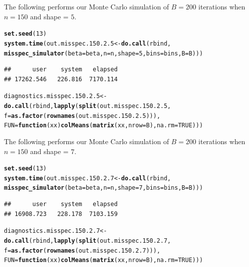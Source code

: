 \documentclass[11pt]{article}\usepackage[]{graphicx}\usepackage[]{color}
\makeatletter
\newcommand{\hlnum}[1]{\textcolor[rgb]{0.686,0.059,0.569}{#1}}%
\newcommand{\hlstd}[1]{\textcolor[rgb]{0.345,0.345,0.345}{#1}}%
\newcommand{\hlkwa}[1]{\textcolor[rgb]{0.161,0.373,0.58}{\textbf{#1}}}%
\newcommand{\hlkwb}[1]{\textcolor[rgb]{0.69,0.353,0.396}{#1}}%
\newcommand{\hlkwc}[1]{\textcolor[rgb]{0.333,0.667,0.333}{#1}}%
\newcommand{\hlkwd}[1]{\textcolor[rgb]{0.737,0.353,0.396}{\textbf{#1}}}%
\newenvironment{kframe}{%
 \def\at@end@of@kframe{}%
 \ifinner\ifhmode%
  \def\at@end@of@kframe{\end{minipage}}%
  \begin{minipage}{\columnwidth}%
 \fi\fi%
 \def\FrameCommand##1{\hskip\@totalleftmargin \hskip-\fboxsep
 \colorbox{shadecolor}{##1}\hskip-\fboxsep
     \hskip-\linewidth \hskip-\@totalleftmargin \hskip\columnwidth}%
 \MakeFramed {\advance\hsize-\width
   \@totalleftmargin\z@ \linewidth\hsize
   \@setminipage}}%
 {\par\unskip\endMakeFramed%
 \at@end@of@kframe}
\newenvironment{knitrout}{}{} %
\makeatother
\begin{document}
The following performs our Monte Carlo simulation of $B = 200$ iterations 
when $n = 150$ and shape = $5$.

\begin{knitrout}
\color{fgcolor}\begin{kframe}
\begin{alltt}
\hlkwd{set.seed}\hlstd{(}\hlnum{13}\hlstd{)}
\hlkwd{system.time}\hlstd{(out.misspec.150.2.5} \hlkwb{<-} \hlkwd{do.call}\hlstd{(rbind,}
  \hlkwd{misspec_simulator}\hlstd{(}\hlkwc{beta} \hlstd{= beta,} \hlkwc{n} \hlstd{= n,} \hlkwc{shape} \hlstd{=} \hlnum{5}\hlstd{,} \hlkwc{bins} \hlstd{= bins,} \hlkwc{B} \hlstd{= B)))}
\end{alltt}
\begin{verbatim}
##      user    system   elapsed 
## 17262.546   226.816  7170.114
\end{verbatim}
\begin{alltt}
\hlstd{diagnostics.misspec.150.2.5} \hlkwb{<-} \hlkwd{do.call}\hlstd{(rbind,} \hlkwd{lapply}\hlstd{(}\hlkwd{split}\hlstd{(out.misspec.150.2.5,}
  \hlkwc{f} \hlstd{=} \hlkwd{as.factor}\hlstd{(}\hlkwd{rownames}\hlstd{(out.misspec.150.2.5))),}
  \hlkwc{FUN} \hlstd{=} \hlkwa{function}\hlstd{(}\hlkwc{xx}\hlstd{)} \hlkwd{colMeans}\hlstd{(}\hlkwd{matrix}\hlstd{(xx,} \hlkwc{nrow} \hlstd{= B),} \hlkwc{na.rm} \hlstd{=} \hlnum{TRUE}\hlstd{)))}
\end{alltt}
\end{kframe}
\end{knitrout}


The following performs our Monte Carlo simulation of $B = 200$ iterations 
when $n = 150$ and shape = $7$.

\begin{knitrout}
\color{fgcolor}\begin{kframe}
\begin{alltt}
\hlkwd{set.seed}\hlstd{(}\hlnum{13}\hlstd{)}
\hlkwd{system.time}\hlstd{(out.misspec.150.2.7} \hlkwb{<-} \hlkwd{do.call}\hlstd{(rbind,}
  \hlkwd{misspec_simulator}\hlstd{(}\hlkwc{beta} \hlstd{= beta,} \hlkwc{n} \hlstd{= n,} \hlkwc{shape} \hlstd{=} \hlnum{7}\hlstd{,} \hlkwc{bins} \hlstd{= bins,} \hlkwc{B} \hlstd{= B)))}
\end{alltt}
\begin{verbatim}
##      user    system   elapsed 
## 16908.723   228.178  7103.159
\end{verbatim}
\begin{alltt}
\hlstd{diagnostics.misspec.150.2.7} \hlkwb{<-} \hlkwd{do.call}\hlstd{(rbind,} \hlkwd{lapply}\hlstd{(}\hlkwd{split}\hlstd{(out.misspec.150.2.7,}
  \hlkwc{f} \hlstd{=} \hlkwd{as.factor}\hlstd{(}\hlkwd{rownames}\hlstd{(out.misspec.150.2.7))),}
  \hlkwc{FUN} \hlstd{=} \hlkwa{function}\hlstd{(}\hlkwc{xx}\hlstd{)} \hlkwd{colMeans}\hlstd{(}\hlkwd{matrix}\hlstd{(xx,} \hlkwc{nrow} \hlstd{= B),} \hlkwc{na.rm} \hlstd{=} \hlnum{TRUE}\hlstd{)))}
\end{alltt}
\end{kframe}
\end{knitrout}
\end{document}
